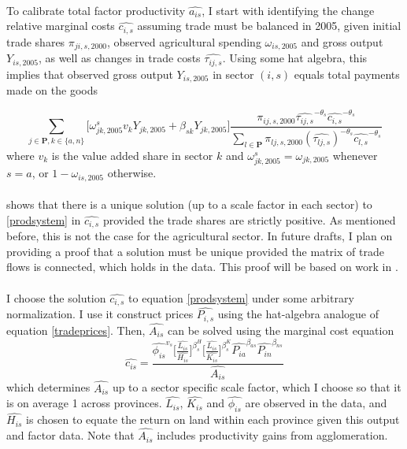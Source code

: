 \documentclass[]{article}
\theoremstyle{plain}
\begin{document}
\paragraph*{}
To calibrate total factor productivity $\hat{a_{is}}$, I start with identifying the change relative marginal costs $\hat{c_{i,s}}$ assuming trade must be balanced in 2005, given initial trade shares $\pi_{ji,s,2000}$, observed agricultural spending $\omega_{is,2005}$ and gross output $Y_{is, 2005}$, as well as changes in trade costs $\hat{\tau_{ij, s}}$. Using some hat algebra, this implies that observed gross output $Y_{is,2005}$ in sector $(i, s)$ equals  total payments made on the goods

\begin{equation} \label{prodsystem}
 \sum_{j \in \mathbf{P}, k \in \{a, n\}}\bigg[\omega^{s}_{jk,2005}v_{k}{Y}_{jk, 2005} + \beta_{s k}Y_{jk, 2005}\bigg] \frac{\pi_{ij, s, 2000}\hat{\tau_{ij, s}}^{-\theta_{s}}\hat{c_{i, s}}^{-\theta_{s}}}{\sum_{l \in \mathbf{P}}\pi_{lj, s, 2000}(\hat{\tau_{lj,s}})^{-\theta_{s}}\hat{c_{l, s}}^{-\theta_{s}}} 
\end{equation} 
where $v_{k}$ is the value added share in sector $k$ and $\omega^{s}_{jk,2005} = \omega_{jk,2005}$ whenever $s=a$, or $1-\omega_{is,2005}$ otherwise. 
\paragraph*{}
\cite{redding2016} shows that there is a unique solution (up to a scale factor in each sector) to \eqref{prodsystem} in $\hat{c_{i,s}}$ provided the trade shares are strictly positive. As mentioned before, this is not the case for the agricultural sector. In future drafts, I plan on providing a proof that a solution must be unique provided the matrix of trade flows is connected, which holds in the data. This proof will be based on work in \cite{connectedsubstitutes}. 
\paragraph*{}
I choose the solution $\hat{c_{i, s}}$ to equation \eqref{prodsystem} under some arbitrary normalization. I use it construct prices $\hat{P_{i,s}}$ using the hat-algebra analogue of equation \eqref{tradeprices}. Then, $\hat{A_{is}}$ can be solved using the marginal cost equation
\begin{equation}\label{marginalcosts}
\hat{c_{is}} = \frac{\hat{\phi_{is}}^{v_{s}}\bigg[\frac{\hat{L_{is}}}{\hat{H_{is}}}\bigg]^{\beta^{H}_{s}}\bigg[\frac{\hat{L_{is}}}{\hat{K_{is}}}\bigg]^{\beta^{K}_{s}}\hat{P_{ia}}^{\beta_{as}}\hat{P_{in}}^{\beta_{ns}}}{\hat{A_{is}}}		
\end{equation}
which determines $\hat{A_{is}}$ up to a sector specific scale factor, which I choose so that it is on average 1 across provinces. $\hat{L_{is}}$, $\hat{K_{is}}$ and $\hat{\phi_{is}}$ are observed in the data, and $\hat{H_{is}}$ is chosen to equate the return on land within each province given this output and factor data. Note that  $\hat{A_{is}}$ includes productivity gains from agglomeration. 
\end{document}
